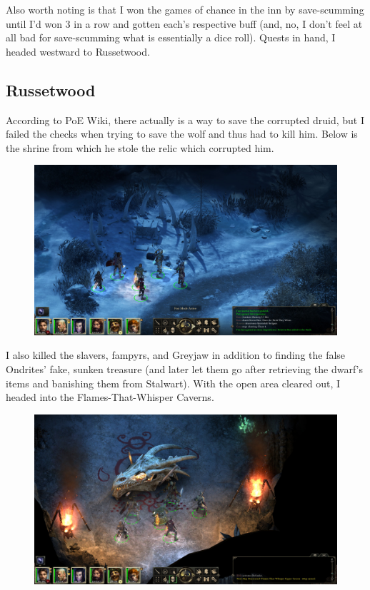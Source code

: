 \documentclass{article}
\begin{document}
Also worth noting is that I won the games of chance in the inn by save-scumming until I'd won 3 in a row and gotten each's respective buff (and, no, I don't feel at all bad for save-scumming what is essentially a dice roll).  Quests in hand, I headed westward to Russetwood.

\subsection{Russetwood}
According to PoE Wiki, there actually is a way to save the corrupted druid, but I failed the checks when trying to save the wolf and thus had to kill him.  Below is the shrine from which he stole the relic which corrupted him.

\begin{figure}
\includegraphics[scale=0.33]{files/blog/2019_08_17_poe_potd_wmpt1/2019_08_17_russetwood_1.jpg}
\end{figure}

I also killed the slavers, fampyrs, and Greyjaw in addition to finding the false Ondrites' fake, sunken treasure (and later let them go after retrieving the dwarf's items and banishing them from Stalwart).  With the open area cleared out, I headed into the Flames-That-Whisper Caverns.

\begin{figure}
\includegraphics[scale=0.33]{files/blog/2019_08_17_poe_potd_wmpt1/2019_08_17_russetwood_2.jpg}
\end{figure}
\end{document}

